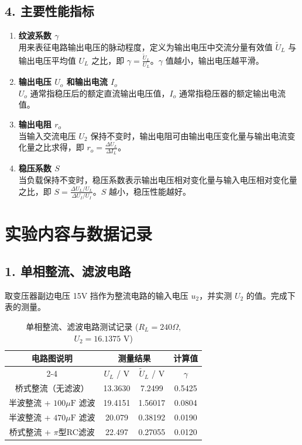 \documentclass[10.5pt]{config}
\begin{document}
\subsection*{4. 主要性能指标}
\begin{enumerate}[label=(\arabic*), leftmargin=2em]
    \item \textbf{纹波系数 $\gamma$} \\
    用来表征电路输出电压的脉动程度，定义为输出电压中交流分量有效值 $\tilde{U}_L$ 与输出电压平均值 $U_L$ 之比，即 $\gamma = \frac{\tilde{U}_L}{U_L}$。$\gamma$ 值越小，输出电压越平滑。
    \item \textbf{输出电压 $U_o$ 和输出电流 $I_o$} \\
    $U_o$ 通常指稳压后的额定直流输出电压值，$I_o$ 通常指稳压器的额定输出电流值。
    \item \textbf{输出电阻 $r_o$} \\
    当输入交流电压 $U_2$ 保持不变时，输出电阻可由输出电压变化量与输出电流变化量之比求得，即 $r_o = \frac{\Delta U_L}{\Delta I_L}$。
    \item \textbf{稳压系数 $S$} \\
    当负载保持不变时，稳压系数表示输出电压相对变化量与输入电压相对变化量之比，即 $S = \frac{\Delta U_L / U_L}{\Delta U_I / U_I}$。$S$ 越小，稳压性能越好。
\end{enumerate}

\section{实验内容与数据记录}

\subsection*{1. 单相整流、滤波电路}
取变压器副边电压 15V 挡作为整流电路的输入电压 $u_2$，并实测 $U_2$ 的值。完成下表的测量。

\begin{table}[H]
    \centering
    \caption{单相整流、滤波电路测试记录 ($R_L = 240\Omega$, $U_2 = 16.1375$ V)}
    \begin{tabular}{|c|c|c|c|}
        \hline
        \multirow{2}{*}{电路图说明} & \multicolumn{2}{c|}{测量结果} & 计算值 \\ \cline{2-4}
        & $U_L$ / V & $\tilde{U}_L$ / V & $\gamma$ \\ \hline
        桥式整流（无滤波） & 13.3630 & 7.2499 & 0.5425 \\ \hline
        半波整流 + $100\mu\text{F}$ 滤波 & 19.4151 & 1.56017 & 0.0804 \\ \hline
        半波整流 + $470\mu\text{F}$ 滤波 & 20.079 & 0.38192 & 0.0190 \\ \hline
        桥式整流 + $\pi$型RC滤波 & 22.497 & 0.27055 & 0.0120 \\ \hline
    \end{tabular}
\end{table}
\end{document}
